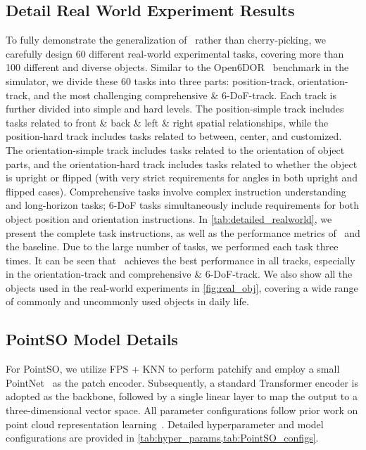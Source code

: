 \subsection{Detail Real World Experiment Results}\label{app:detail_realworld}
To fully demonstrate the generalization of \sofar~rather than cherry-picking, we carefully design 60 different real-world experimental tasks, covering more than 100 different and diverse objects. Similar to the Open6DOR~\cite{Open6DOR24} benchmark in the simulator, we divide these 60 tasks into three parts: position-track, orientation-track, and the most challenging comprehensive \& 6-DoF-track. Each track is further divided into simple and hard levels. The position-simple track includes tasks related to front \& back \& left \& right spatial relationships, while the position-hard track includes tasks related to between, center, and customized. The orientation-simple track includes tasks related to the orientation of object parts, and the orientation-hard track includes tasks related to whether the object is upright or flipped (with very strict requirements for angles in both upright and flipped cases). Comprehensive tasks involve complex instruction understanding and long-horizon tasks; 6-DoF tasks simultaneously include requirements for both object position and orientation instructions. In \cref{tab:detailed_realworld}, we present the complete task instructions, as well as the performance metrics of \sofar~and the baseline. Due to the large number of tasks, we performed each task three times. It can be seen that \sofar~achieves the best performance in all tracks, especially in the orientation-track and comprehensive \& 6-DoF-track. We also show all the objects used in the real-world experiments in \cref{fig:real_obj}, covering a wide range of commonly and uncommonly used objects in daily life.





\subsection{PointSO Model Details}\label{app:pointso_details}
For PointSO, we utilize FPS + KNN to perform patchify and employ a small PointNet~\cite{PointNet} as the patch encoder. Subsequently, a standard Transformer encoder is adopted as the backbone, followed by a single linear layer to map the output to a three-dimensional vector space. All parameter configurations follow prior work on point cloud representation learning~\cite{ACT23,ReCon23,ShapeLLM24}. Detailed hyperparameter and model configurations are provided in \cref{tab:hyper_params,tab:PointSO_configs}.

